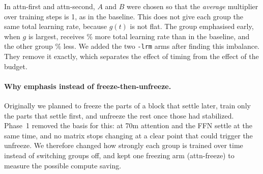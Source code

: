 \documentclass[11pt]{article}
\begin{document}
In attn-first and attn-second, $A$ and $B$ were chosen so that the
\emph{average} multiplier over training steps is 1, as in the baseline. This
does not give each group the same total learning rate, because $g(t)$ is not
flat. The group emphasised early, when $g$ is largest, receives
\BudgetEarlyPct\% more total learning rate than in the baseline, and the
other group \BudgetLatePct\% less. We added the two \texttt{-lrm} arms after
finding this imbalance. They remove it exactly, which separates the effect of
timing from the effect of the budget.

\paragraph{Why emphasis instead of freeze-then-unfreeze.} Originally we planned
to freeze the parts of a block that settle later, train only the parts that
settle first, and unfreeze the rest once those had stabilized. Phase~1 removed
the basis for this: at 70m attention and the FFN settle at the same time, and
no matrix stops changing at a clear point that could trigger the unfreeze.
We therefore changed how strongly each group is trained over time instead of switching groups off, and kept one freezing arm (attn-freeze) to measure the possible compute saving.



\end{document}
